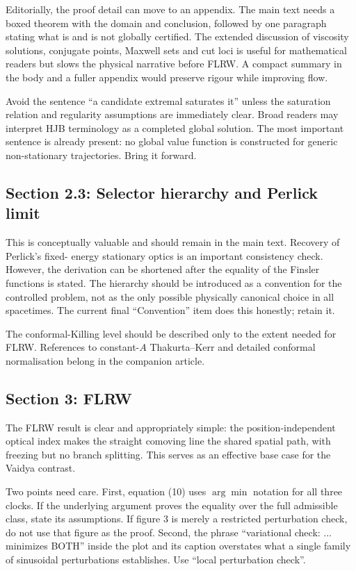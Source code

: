\documentclass[11pt,a4paper]{article}
\begin{document}
Editorially, the proof detail can move to an appendix.  The main text needs a boxed theorem with
the domain and conclusion, followed by one paragraph stating what is and is not globally
certified.  The extended discussion of viscosity solutions, conjugate points, Maxwell sets and
cut loci is useful for mathematical readers but slows the physical narrative before FLRW.  A
compact summary in the body and a fuller appendix would preserve rigour while improving flow.

Avoid the sentence ``a candidate extremal saturates it'' unless the saturation relation and
regularity assumptions are immediately clear.  Broad readers may interpret HJB terminology as a
completed global solution.  The most important sentence is already present: no global value
function is constructed for generic non-stationary trajectories.  Bring it forward.

\subsection{Section 2.3: Selector hierarchy and Perlick limit}

This is conceptually valuable and should remain in the main text.  Recovery of Perlick's fixed-
energy stationary optics is an important consistency check.  However, the derivation can be
shortened after the equality of the Finsler functions is stated.  The hierarchy should be
introduced as a convention for the controlled problem, not as the only possible physically
canonical choice in all spacetimes.  The current final ``Convention'' item does this honestly;
retain it.

The conformal-Killing level should be described only to the extent needed for FLRW.  References to
constant-$A$ Thakurta--Kerr and detailed conformal normalisation belong in the companion article.

\subsection{Section 3: FLRW}

The FLRW result is clear and appropriately simple: the position-independent optical index makes
the straight comoving line the shared spatial path, with freezing but no branch splitting.  This
serves as an effective base case for the Vaidya contrast.

Two points need care.  First, equation (10) uses $\arg\min$ notation for all three clocks.  If the
underlying argument proves the equality over the full admissible class, state its assumptions.  If
figure 3 is merely a restricted perturbation check, do not use that figure as the proof.  Second,
the phrase ``variational check: ... minimizes BOTH'' inside the plot and its caption overstates what
a single family of sinusoidal perturbations establishes.  Use ``local perturbation check''.
\end{document}
